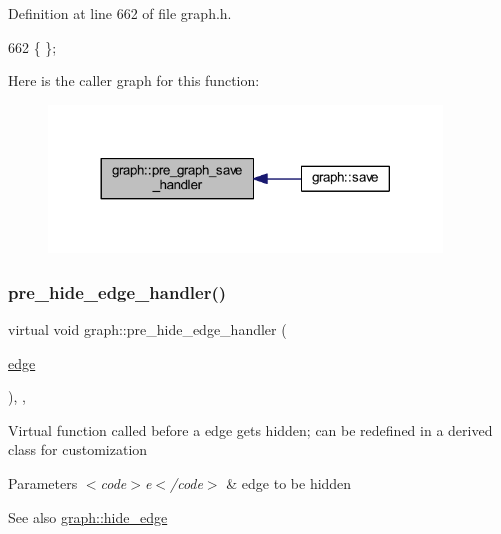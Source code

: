 Definition at line 662 of file graph.\+h.


\begin{DoxyCode}
662 \{ \};
\end{DoxyCode}
Here is the caller graph for this function\+:
\nopagebreak
\begin{figure}[H]
\begin{center}
\leavevmode
\includegraphics[width=296pt]{classgraph_ab257e02f6fd04fef244032a3a15bec9f_icgraph}
\end{center}
\end{figure}
\mbox{\label{classgraph_aa33201befa6ad7433becd7424d6de55b}} 
\subsubsection{\texorpdfstring{pre\+\_\+hide\+\_\+edge\+\_\+handler()}{pre\_hide\_edge\_handler()}}
{\footnotesize\ttfamily virtual void graph\+::pre\+\_\+hide\+\_\+edge\+\_\+handler (\begin{DoxyParamCaption}\item[{\mbox{\hyperlink{classedge}{edge}}}]{ }\end{DoxyParamCaption})\hspace{0.3cm}{\ttfamily [inline]}, {\ttfamily [virtual]}, {\ttfamily [inherited]}}

Virtual function called before a edge gets hidden; can be redefined in a derived class for customization


\begin{DoxyParams}{Parameters}
{\em $<$code$>$e$<$/code$>$} & edge to be hidden \\
\hline
\end{DoxyParams}
\begin{DoxySeeAlso}{See also}
\mbox{\hyperlink{classgraph_ab2f8520bcac080d73c55228fecc61825}{graph\+::hide\+\_\+edge}} 
\end{DoxySeeAlso}


